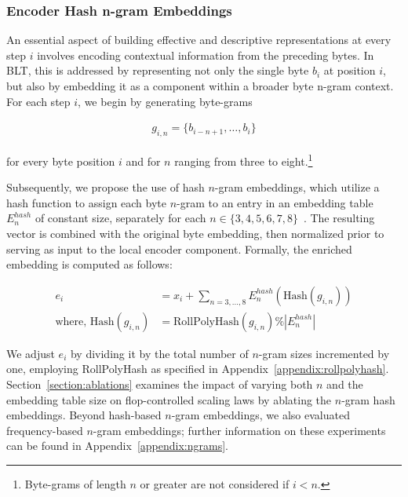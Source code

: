 \subsubsection{Encoder Hash n-gram Embeddings}
\label{sec:ngram-emb}
\label{sec:hash-emb}
An essential aspect of building effective and descriptive representations at every step $i$ involves encoding contextual information from the preceding bytes. In {\textsc BLT}, this is addressed by representing not only the single byte $b_i$ at position $i$, but also by embedding it as a component within a broader byte n-gram context. For each step $i$, we begin by generating byte-grams

\begin{align}
    g_{i,n}=\{b_{i-n + 1},\ldots, b_i\}
\end{align}

for every byte position $i$ and for $n$ ranging from three to eight.\footnote{
Byte-grams of length $n$ or greater are not considered if $i<n$. }

Subsequently, we propose the use of hash $n$-gram embeddings, which utilize a hash function to assign each byte $n$-gram to an entry in an embedding table $E_{n}^{hash}$ of constant size, separately for each $n \in\{3,4,5,6,7,8\}$~\citep{bai2010learning}. The resulting vector is combined with the original byte embedding, then normalized prior to serving as input to the local encoder component. Formally, the enriched embedding is computed as follows:

\begin{align}
e_i &= x_i + \sum_{n = 3,...,8}E_{n}^{hash}(\text{Hash}(g_{i,n})) \\
\text{where, Hash}(g_{i,n}) &= \text{RollPolyHash}(g_{i,n}) \% |E_{n}^{hash}|
\end{align}

We adjust $e_i$ by dividing it by the total number of $n$-gram sizes incremented by one, employing RollPolyHash as specified in Appendix~\ref{appendix:rollpolyhash}. Section~\ref{section:ablations} examines the impact of varying both $n$ and the embedding table size on flop-controlled scaling laws by ablating the $n$-gram hash embeddings. Beyond hash-based $n$-gram embeddings, we also evaluated frequency-based $n$-gram embeddings; further information on these experiments can be found in Appendix~\ref{appendix:ngrams}.

